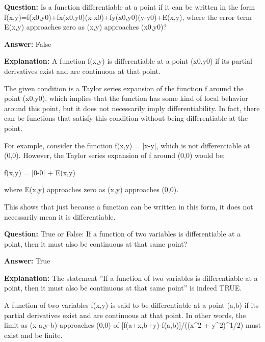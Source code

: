 \documentclass{article}
\begin{document}
                \vspace{0.5cm} 
        
            
                \textbf {Question:} Is a function differentiable at a point if it can be written in the form f(x,y)=f(x0,y0)+fx(x0,y0)(x-x0)+fy(x0,y0)(y-y0)+E(x,y), where the error term E(x,y) approaches zero as (x,y) approaches (x0,y0)?
                
                \textbf{Answer:} False

                \textbf{Explanation:} A function f(x,y) is differentiable at a point (x0,y0) if its partial derivatives exist and are continuous at that point.

The given condition is a Taylor series expansion of the function f around the point (x0,y0), which implies that the function has some kind of local behavior around this point, but it does not necessarily imply differentiability. In fact, there can be functions that satisfy this condition without being differentiable at the point.

For example, consider the function f(x,y) = |x-y|, which is not differentiable at (0,0). However, the Taylor series expansion of f around (0,0) would be:

f(x,y) = |0-0| + E(x,y)

where E(x,y) approaches zero as (x,y) approaches (0,0).

This shows that just because a function can be written in this form, it does not necessarily mean it is differentiable.
                
                \vspace{0.5cm} 
        
            
                \textbf {Question:} True or False: If a function of two variables is differentiable at a point, then it must also be continuous at that same point?
                
                \textbf{Answer:} True

                \textbf{Explanation:} The statement ''If a function of two variables is differentiable at a point, then it must also be continuous at that same point'' is indeed TRUE.

A function of two variables f(x,y) is said to be differentiable at a point (a,b) if its partial derivatives exist and are continuous at that point. In other words, the limit as (x-a,y-b) approaches (0,0) of [f(a+x,b+y)-f(a,b)]/((x{\textasciicircum}2 + y{\textasciicircum}2){\textasciicircum}1/2) must exist and be finite.
\end{document}
